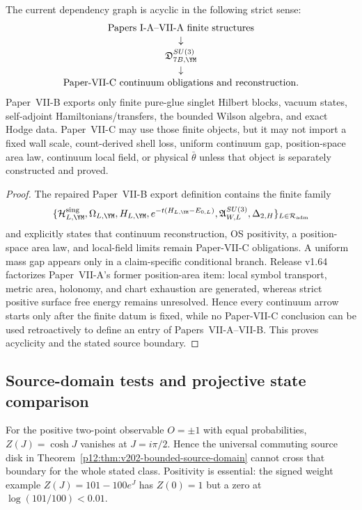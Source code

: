 \documentclass[12pt,a4paper]{article}
\begin{document}
\begin{theorem}
\label{p12:thm:paper11-paper12-acyclic}
The current dependency graph is acyclic in the following strict sense:
\[
\begin{gathered}
\text{Papers I-A--VII-A finite structures}\\[-2pt]
\downarrow\\[-2pt]
\mathfrak D_{7B,\YM}^{SU(3)}\\[-2pt]
\downarrow\\[-2pt]
\text{Paper-VII-C continuum obligations and reconstruction}.
\end{gathered}
\]
Paper~VII-B exports only finite pure-glue singlet Hilbert blocks, vacuum states, self-adjoint Hamiltonians/transfers, the bounded Wilson algebra, and exact Hodge data.  Paper~VII-C may use those finite objects, but it may not import a fixed wall scale, count-derived shell loss, uniform continuum gap, position-space area law, continuum local field, or physical \(\bar\theta\) unless that object is separately constructed and proved.
\end{theorem}
\begin{proof}
The repaired Paper~VII-B export definition contains the finite family
\[
\{\mathcal H_{L,\YM}^{\rm sing},\Omega_{L,\YM},H_{L,\YM},e^{-t(H_{L,\YM}-E_{0,L})},\mathfrak A_{W,L}^{SU(3)},\Delta_{2,H}\}_{L\in\mathcal R_{\rm adm}}
\]
and explicitly states that continuum reconstruction, OS positivity, a position-space area law, and local-field limits remain Paper-VII-C obligations.  A uniform mass gap appears only in a claim-specific conditional branch.  Release v1.64 factorizes Paper~VII-A's former position-area item: local symbol transport, metric area, holonomy, and chart exhaustion are generated, whereas strict positive surface free energy remains unresolved.  Hence every continuum arrow starts only after the finite datum is fixed, while no Paper-VII-C conclusion can be used retroactively to define an entry of Papers~VII-A--VII-B.  This proves acyclicity and the stated source boundary.
\end{proof}



\subsection{Source-domain tests and projective state comparison}
\label{p12:app:v202-source-comparison}
For the positive two-point observable $O=\pm1$ with equal probabilities,
$Z(J)=\cosh J$ vanishes at $J=i\pi/2$. Hence the universal commuting
source disk in Theorem~\ref{p12:thm:v202-bounded-source-domain} cannot
cross that boundary for the whole stated class. Positivity is essential:
the signed weight example $Z(J)=101-100e^J$ has $Z(0)=1$ but a zero
at $\log(101/100)<0.01$.
\end{document}
